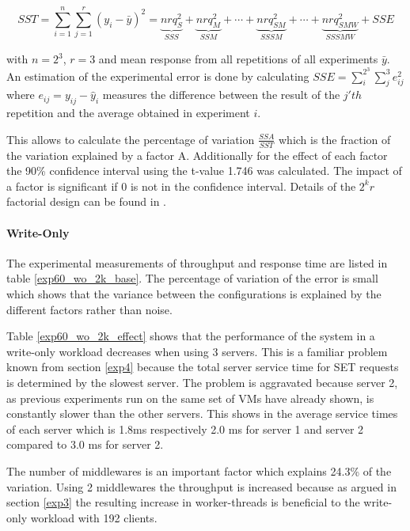 \documentclass[report.tex]{subfiles}
\begin{document}
\begin{equation}
 	SST = \sum_{i=1}^n\sum_{j=1}^r (y_i - \bar{y})^2 = \underbrace{nrq_S^2}_{SSS} + \underbrace{nrq_M^2}_{SSM} + \cdots +  \underbrace{nrq_{SM}^2}_{SSSM} + \cdots + \underbrace{nrq_{SMW}^2}_{SSSMW} + SSE
\end{equation}

with $n=2^3$, $r=3$ and mean response from all repetitions of all experiments $\bar{y}$. 
An estimation of the experimental error is done by  calculating  $SSE = \sum_{i}^{2^3}\sum_{j}^{3} e_{ij}^2$ where $e_{ij} = y_{ij} - \hat{y}_{i}$ measures the difference between the result of the $j'th$ repetition and the average obtained in experiment $i$.

This allows to calculate the percentage of variation $\frac{SSA}{SST}$ which is the fraction of the variation explained by a factor A.
Additionally for the effect of each factor the 90\% confidence interval using the t-value 1.746 was calculated.
The impact of a factor is significant if 0 is not in the confidence interval.
Details of the $2^{k}r$ factorial design can be found in \cite{books/daglib/0076234}.

\paragraph{Write-Only}

The experimental measurements of throughput and response time are listed in table \ref{exp60_wo_2k_base}.
The percentage of variation of the error is small which shows that the variance between the configurations is explained by the different factors rather than noise.

Table \ref{exp60_wo_2k_effect} shows that the performance of the system in a write-only workload decreases when using 3 servers.  This is a familiar problem known from section \ref{exp4} because the total server service time for SET requests is determined by the slowest server. The problem is aggravated because server 2, as previous experiments run on the same set of VMs have already shown, is constantly slower than the other servers. This shows in the average service times of each server which is 1.8ms respectively 2.0 ms for server 1 and server 2 compared to 3.0 ms for server 2.

The number of middlewares is an important factor which explains 24.3\% of the variation. Using 2 middlewares the throughput is increased because as argued in section \ref{exp3} the resulting increase in worker-threads is beneficial to the write-only workload with 192 clients.
\end{document}
